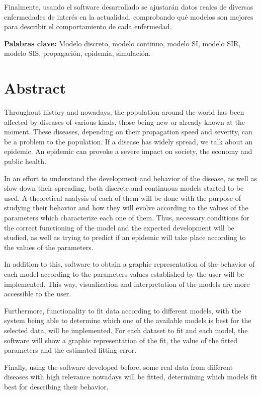 Finalmente, usando el software desarrollado se ajustarán datos reales de diversas enfermedades de interés en la actualidad, comprobando qué modelos son mejores para describir el comportamiento de cada enfermedad.

\textbf{Palabras clave: } Modelo discreto, modelo continuo, modelo SI, modelo SIR, modelo SIS, propagación, epidemia, simulación.



\chapter*{Abstract}

Throughout history and nowadays, the population around the world has been affected by diseases of various kinds, those being new or already known at the moment. These diseases, depending on their propagation speed and severity, can be a problem to the population. If a disease has widely spread, we talk about an epidemic. An epidemic can provoke a severe impact on society, the economy and public health.

In an effort to understand the development and behavior of the disease, as well as slow down their spreading, both discrete and continuous models started to be used. A theoretical analysis of each of them will be done with the purpose of studying their behavior and how they will evolve according to the values of the parameters which characterize each one of them. Thus, necessary conditions for the correct functioning of the model and the expected development will be studied, as well as trying to predict if an epidemic will take place according to the values of the parameters.

In addition to this, software to obtain a graphic representation of the behavior of each model according to the parameters values established by the user will be implemented. This way, visualization and interpretation of the models are more accessible to the user.

Furthermore, functionality to fit data according to different models, with the system being able to determine which one of the available models is best for the selected data, will be implemented. For each dataset to fit and each model, the software will show a graphic representation of the fit, the value of the fitted parameters and the estimated fitting error.

Finally, using the software developed before, some real data from different diseases with high relevance nowadays will be fitted, determining which models fit best for describing their behavior.

